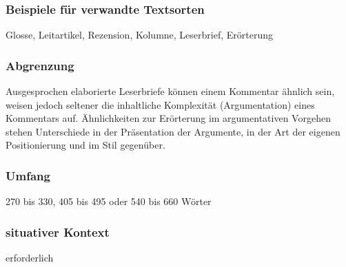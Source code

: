 \subsubsection{Beispiele für verwandte Textsorten}
Glosse, Leitartikel, Rezension, Kolumne, Leserbrief, Erörterung
\subsubsection{Abgrenzung} Ausgesprochen elaborierte Leserbriefe können einem Kommentar
ähnlich sein, weisen jedoch seltener die inhaltliche Komplexität
(Argumentation) eines Kommentars auf. Ähnlichkeiten zur Erörterung
im argumentativen Vorgehen stehen Unterschiede in der Präsentation der Argumente, in der Art der eigenen Positionierung und im Stil
gegenüber.
\subsubsection{Umfang}
270 bis 330, 405 bis 495 oder 540 bis 660 Wörter

\subsubsection{situativer Kontext}erforderlich